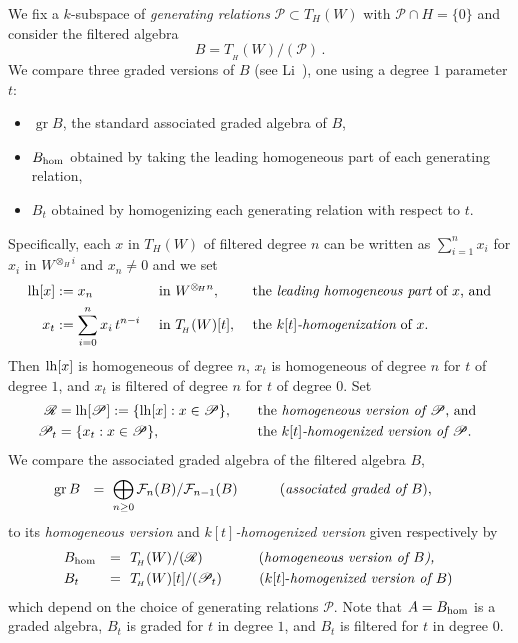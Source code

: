 \documentclass[11pt]{amsart}
\numberwithin{equation}{section}
\DeclareMathOperator{\gr}{gr}
\newcommand{\BBB}{B}
\newcommand{\sA}{A }
\newcommand{\RR}{\mathscr{R} }
\newcommand{\PP}{\mathscr{P}}
\newcommand{\LH}{{\rm{lh}}}
\newcommand{\hh}{\rm{hom}}
\renewcommand{\_}[1]{\mbox{$_{\left( #1 \right)}$}}
\newcommand{\F}{\mathcal F}
\newcommand{\ot}{\otimes}
\newcommand{\Ho}{H}%
\begin{document}
We fix a $k$-subspace
of {\em generating relations} $\PP\subset T_H(W)$
with $\PP\cap H = \{0\}$
and  consider the filtered algebra 
$$ \BBB=T_{\! _H}(W)/(\PP)\, .$$
%
We compare three graded versions of $\BBB$
(see Li~\cite{Li}), one using  a degree $1$ parameter $t$:
\begin{itemize}\itemindent=-19pt \itemsep=1ex
\item  $\gr \BBB$, 
      the standard associated graded algebra of $\BBB$,
\item $\BBB_{\hh}$ obtained by taking the leading homogeneous part of each generating
  relation,
  \item $\BBB_t$ obtained by 
    homogenizing each generating relation with respect to $t$.
        \end{itemize}
Specifically, each $x$ in $T_H(W)$ of {filtered degree} $n$
can be written as $\sum_{i=1}^n x_i$
for $x_i$ in $W^{\ot_{\!\Ho} i}$ and $x_n\neq 0$ and we set
$$\begin{aligned}
  \LH[x] &:=x_n &&\text{ in } W^{\ot_{\!\Ho} n},
&&\text{ the {\em leading homogeneous part} of $x$, and}\\
  x_t &:=\sum_{i=0}^n x_i\, t^{n-i} &&\text{ in } T_{\! _H}(W)[t],
  &&\text{ the {\em $k[t]$-homogenization}
of $x$.}
\end{aligned}
$$
Then $\LH[x]$ is homogeneous of degree $n$,
$x_t$ is 
homogeneous of degree $n$ for $t$ of degree $1$,
and $x_t$ is filtered of
degree $n$ for $t$ of degree $0$.
Set
\begin{equation}\label{LH}
  \begin{aligned}
  \RR&=\LH[\PP ] :=\{ \LH[x]: x\in \PP\},
 &&\quad\text{the {\em homogeneous version of $\PP$}, and } \\
 \PP_t&=\{ x_t: x\in \PP\},
 &&\quad\text{the {\em $k[t]$-homogenized version of $\PP$}. }
\end{aligned}
\end{equation}
We compare the associated graded algebra of
the filtered algebra $\BBB$,
$$
\hphantom{xxxx} \gr \BBB \ \ =\ \bigoplus_{n\geq 0} \F_n(\BBB)/\F_{n-1}(\BBB)
\qquad\quad \text{({\em associated graded of $\BBB$}),}
\hspace{10ex}\hphantom{x}
$$
to its {\em homogeneous version}
and  {\em $k[t]$-homogenized version} 
given respectively by 
\begin{equation}\label{homogeneousversion}
\begin{aligned}
  &\BBB_{\hh}
  &=&  \ \ T_{\! _H}(W)/(\RR) 
\qquad\text{\ \ \ \ \ \ (\em homogeneous version of  $\BBB$),}
\\
&\BBB_t
&=& \ \ T_{\! _H}(W)[t]/(\PP_t) 
\qquad\ \text{ ($k[t]$-{\em homogenized version of }$\BBB$)}
\, \end{aligned}
\end{equation}
which depend on the choice of generating relations $\PP$.
Note that $\sA=\BBB_{\hh}$ is a graded algebra, $\BBB_t$ is graded for $t$ in
degree $1$, and $\BBB_t$ is filtered for $t$ in degree $0$.
\end{document}
